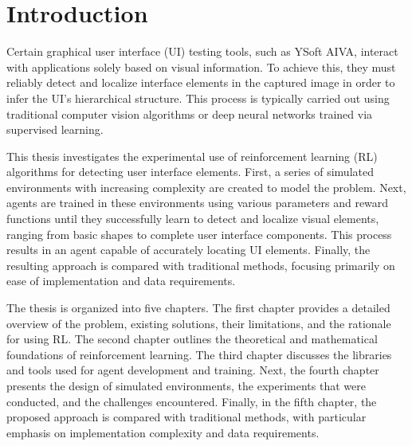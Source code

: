 \documentclass[
  digital,     %
  oneside,     %
  nosansbold,  %
  nocolorbold, %
  lof,         %
  lot,         %
]{fithesis4}
\begin{document}
\chapter*{Introduction}

Certain graphical user interface (UI) testing tools, such as YSoft AIVA, interact with applications solely based on visual information. To achieve this, they must reliably detect and localize interface elements in the captured image in order to infer the UI's hierarchical structure. This process is typically carried out using traditional computer vision algorithms or deep neural networks trained via supervised learning.

This thesis investigates the experimental use of reinforcement learning (RL) algorithms for detecting user interface elements. First, a series of simulated environments with increasing complexity are created to model the problem. Next, agents are trained in these environments using various parameters and reward functions until they successfully learn to detect and localize visual elements, ranging from basic shapes to complete user interface components. This process results in an agent capable of accurately locating UI elements. Finally, the resulting approach is compared with traditional methods, focusing primarily on ease of implementation and data requirements.

The thesis is organized into five chapters. The first chapter provides a detailed overview of the problem, existing solutions, their limitations, and the rationale for using RL. The second chapter outlines the theoretical and mathematical foundations of reinforcement learning. The third chapter discusses the libraries and tools used for agent development and training. Next, the fourth chapter presents the design of simulated environments, the experiments that were conducted, and the challenges encountered. Finally, in the fifth chapter, the proposed approach is compared with traditional methods, with particular emphasis on implementation complexity and data requirements.
\end{document}
